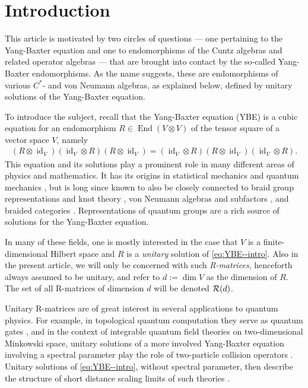 \documentclass[12pt,a4paper]{amsart}
\numberwithin{equation}{section}
\theoremstyle{remark}
\def\End{\operatorname{End}}
\def\dim{\operatorname{dim}}
\def\id{\operatorname{id}}
\def\id{\operatorname{id}}
\newcommand{\ot}{\otimes}
\begin{document}
\vspace*{-8mm}
\tableofcontents



\section{Introduction}


This article is motivated by two circles of questions --- one pertaining to the Yang-Baxter equation and one to endomorphisms of the Cuntz algebras and related operator algebras --- that are brought into contact by the so-called Yang-Baxter endomorphisms. As the name suggests, these are endomorphisms of various $C^*$- and von Neumann algebras, as explained below, defined by unitary solutions of the Yang-Baxter equation.

To introduce the subject, recall that the Yang-Baxter equation (YBE) is a cubic equation for an endomorphism $R\in\End(V\ot V)$ of the tensor square of a vector space $V$, namely
\begin{align}\label{eq:YBE--intro}
    (R\ot\id_V)(\id_V\ot R)(R\ot \id_V)=(\id_V\ot R)(R\ot \id_V)(\id_V\ot R).
\end{align}
This equation and its solutions play a prominent role in many different areas of physics and mathematics. It has its origins in statistical mechanics and quantum mechanics \cite{Yang:1967,Baxter:1972}, but is long since known to also be closely connected to braid group representations and knot theory \cite{Jones:1987,Turaev:1988}, von Neumann algebras and subfactors \cite{Jones:1983_2}, and braided categories 
\cite{Longo:1992,TubaWenzl:2005_2,EvansPugh:2012,GiorgettiRehren:2018}. Representations of quantum groups \cite{Drinfeld:1986,Jimbo:1986} are a rich source of solutions for the Yang-Baxter equation.

In many of these fields, one is mostly interested in the case that $V$ is a finite-dimensional Hilbert space and $R$ is a {\em unitary} solution of \eqref{eq:YBE--intro}. Also in the present article, we will only be concerned with such {\em R-matrices}, henceforth always assumed to be unitary, and refer to $d:=\dim V$ as the dimension of $R$. The set of all R-matrices of dimension $d$ will be denoted $\mathcal{R}(d)$.

Unitary R-matrices are of great interest in several applications to quantum physics. For example, in topological quantum computation they serve as quantum gates \cite{KauffmanLomonacoJr:2004_2,BurtonGould:2006,RowellWang:2012}, and in the context of integrable quantum field theories on two-dimensional Minkowski space, unitary solutions of a more involved Yang-Baxter equation involving a spectral parameter play the role of two-particle collision operators \cite{AbdallaAbdallaRothe:2001}. Unitary solutions of \eqref{eq:YBE--intro}, without spectral parameter, then describe the structure of short distance scaling limits of such theories \cite{LechnerScotford:2019}. 
\end{document}
